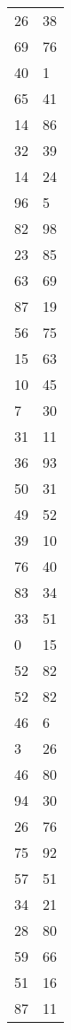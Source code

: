 \documentclass{IEEEtran}
\begin{document}
\begin{table}[]
\begin{tabular}{ll}
    26  & 38 \\
    69  & 76 \\
    40  & 1  \\
    65  & 41 \\
    14  & 86 \\
    32  & 39 \\
    14  & 24 \\
    96  & 5  \\
    82  & 98 \\
    23  & 85 \\
    63  & 69 \\
    87  & 19 \\
    56  & 75 \\
    15  & 63 \\
    10  & 45 \\
    7   & 30 \\
    31  & 11 \\
    36  & 93 \\
    50  & 31 \\
    49  & 52 \\
    39  & 10 \\
    76  & 40 \\
    83  & 34 \\
    33  & 51 \\
    0   & 15 \\
    52  & 82 \\
    52  & 82 \\
    46  & 6  \\
    3   & 26 \\
    46  & 80 \\
    94  & 30 \\
    26  & 76 \\
    75  & 92 \\
    57  & 51 \\
    34  & 21 \\
    28  & 80 \\
    59  & 66 \\
    51  & 16 \\
    87  & 11
    \end{tabular}
    \end{table}
\end{document}

